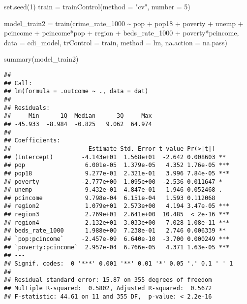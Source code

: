 \documentclass[
  11pt,
]{article}
\newenvironment{Shaded}{\begin{snugshade}}{\end{snugshade}}
\newcommand{\AttributeTok}[1]{\textcolor[rgb]{0.77,0.63,0.00}{#1}}
\newcommand{\DecValTok}[1]{\textcolor[rgb]{0.00,0.00,0.81}{#1}}
\newcommand{\FunctionTok}[1]{\textcolor[rgb]{0.00,0.00,0.00}{#1}}
\newcommand{\NormalTok}[1]{#1}
\newcommand{\OtherTok}[1]{\textcolor[rgb]{0.56,0.35,0.01}{#1}}
\newcommand{\SpecialCharTok}[1]{\textcolor[rgb]{0.00,0.00,0.00}{#1}}
\newcommand{\StringTok}[1]{\textcolor[rgb]{0.31,0.60,0.02}{#1}}
\begin{document}
\begin{Shaded}
\begin{Highlighting}[]
\FunctionTok{set.seed}\NormalTok{(}\DecValTok{1}\NormalTok{)}
\NormalTok{train }\OtherTok{=} \FunctionTok{trainControl}\NormalTok{(}\AttributeTok{method =} \StringTok{"cv"}\NormalTok{, }\AttributeTok{number =} \DecValTok{5}\NormalTok{)}

\NormalTok{model\_train2 }\OtherTok{=} \FunctionTok{train}\NormalTok{(crime\_rate\_1000 }\SpecialCharTok{\textasciitilde{}}  
\NormalTok{                   pop }\SpecialCharTok{+}\NormalTok{ pop18 }\SpecialCharTok{+} 
\NormalTok{                  poverty }\SpecialCharTok{+}\NormalTok{ unemp }\SpecialCharTok{+}\NormalTok{ pcincome }\SpecialCharTok{+}\NormalTok{ pcincome}\SpecialCharTok{*}\NormalTok{pop }\SpecialCharTok{+}\NormalTok{ region }\SpecialCharTok{+}
\NormalTok{                  beds\_rate\_1000  }\SpecialCharTok{+}
\NormalTok{                  poverty}\SpecialCharTok{*}\NormalTok{pcincome, }\AttributeTok{data =}\NormalTok{ cdi\_model,}
                   \AttributeTok{trControl =}\NormalTok{ train,}
                   \AttributeTok{method =} \StringTok{\textquotesingle{}lm\textquotesingle{}}\NormalTok{,}
                   \AttributeTok{na.action =}\NormalTok{ na.pass)}

\FunctionTok{summary}\NormalTok{(model\_train2)}
\end{Highlighting}
\end{Shaded}

\begin{verbatim}
## 
## Call:
## lm(formula = .outcome ~ ., data = dat)
## 
## Residuals:
##     Min      1Q  Median      3Q     Max 
## -45.933  -8.984  -0.825   9.062  64.974 
## 
## Coefficients:
##                      Estimate Std. Error t value Pr(>|t|)    
## (Intercept)        -4.143e+01  1.568e+01  -2.642 0.008603 ** 
## pop                 6.001e-05  1.379e-05   4.352 1.76e-05 ***
## pop18               9.277e-01  2.321e-01   3.996 7.84e-05 ***
## poverty            -2.777e+00  1.095e+00  -2.536 0.011647 *  
## unemp               9.432e-01  4.847e-01   1.946 0.052468 .  
## pcincome            9.798e-04  6.151e-04   1.593 0.112068    
## region2             1.079e+01  2.573e+00   4.194 3.47e-05 ***
## region3             2.769e+01  2.641e+00  10.485  < 2e-16 ***
## region4             2.132e+01  3.033e+00   7.028 1.08e-11 ***
## beds_rate_1000      1.988e+00  7.238e-01   2.746 0.006339 ** 
## `pop:pcincome`     -2.457e-09  6.640e-10  -3.700 0.000249 ***
## `poverty:pcincome`  2.957e-04  6.766e-05   4.371 1.63e-05 ***
## ---
## Signif. codes:  0 '***' 0.001 '**' 0.01 '*' 0.05 '.' 0.1 ' ' 1
## 
## Residual standard error: 15.87 on 355 degrees of freedom
## Multiple R-squared:  0.5802, Adjusted R-squared:  0.5672 
## F-statistic: 44.61 on 11 and 355 DF,  p-value: < 2.2e-16
\end{verbatim}
\end{document}
